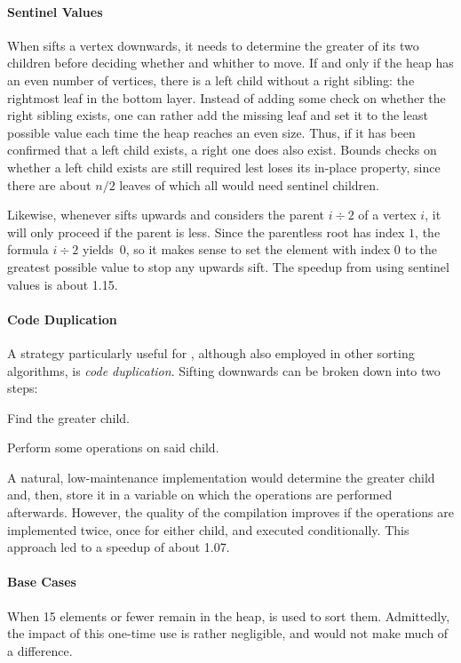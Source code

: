 \paragraph{Sentinel Values}
When \HS{} sifts a vertex downwards, it needs to determine the greater of its two children before deciding whether and whither to move.
If and only if the heap has an even number of vertices, there is a left child without a right sibling:
the rightmost leaf in the bottom layer.
Instead of adding some check on whether the right sibling exists, one can rather add the missing leaf and set it to the least possible value each time the heap reaches an even size.
Thus, if it has been confirmed that a left child exists, a right one does also exist.
Bounds checks on whether a left child exists are still required lest \HS{} loses its in-place property, since there are about \(n/2\) leaves of which all would need sentinel children.

Likewise, whenever \HS{} sifts upwards and considers the parent \(i \div 2\) of a vertex \(i\), it will only proceed if the parent is less.
Since the parentless root has index \(1\), the formula \(i \div 2\) yields~\(0\), so it makes sense to set the element with index \(0\) to the greatest possible value to stop any upwards sift.
The speedup from using sentinel values is about \num{1.15}.


\paragraph{Code Duplication}
A strategy particularly useful for \HS{}, although also employed in other sorting algorithms, is \emph{code duplication}.
Sifting downwards can be broken down into two steps:
\begin{enumerate*}
	\item
	Find the greater child.

	\item
	Perform some operations on said child.
\end{enumerate*}
A natural, low-maintenance implementation would determine the greater child and, then, store it in a variable on which the operations are performed afterwards.
However, the quality of the compilation improves if the operations are implemented twice, once for either child, and executed conditionally.
This approach led to a speedup of about \num{1.07}.


\paragraph{Base Cases}
When 15 elements or fewer remain in the heap, \IS{} is used to sort them.
Admittedly, the impact of this one-time use is rather negligible, and \ShS{} would not make much of a difference.
